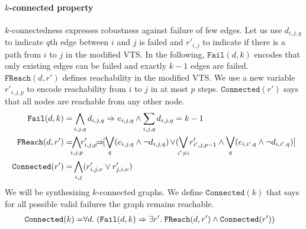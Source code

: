 \paragraph{$k$-connected property}
%
$k$-connectedness expresses robustness against failure of few edges.
%
Let us use $d_{i,j,q}$ to indicate $q$th edge between $i$ and $j$ is failed
and $r'_{i,j}$ to indicate if there is a path from $i$ to $j$ in
the modified VTS.
%
%
In the following, $\texttt{Fail}(d,k)$ encodes that only
existing edges can be failed and exactly $k-1$ edges are failed.
%
$\texttt{FReach}(d,r')$ defines reachability in the modified VTS.
%
We use a new variable $r'_{i,j,p}$ to encode reachability from
$i$ to $j$ in at most $p$ steps.
%
$\texttt{Connected}(r')$ says that all nodes are reachable from any
other node.
\begin{align*}
  \texttt{Fail}(d,k) = & 
  \bigwedge\limits_{i,j,q} d_{i,j,q} \limplies e_{i,j,q}  \land 
  \sum_{i,j,q} d_{i,j,q} = k-1\\
  \texttt{FReach}(d,r') = &\hspace{-1ex}
   \bigwedge\limits_{i,j,p}  \hspace{-1ex}r^{\prime}_{i,j,p} \hspace{-1ex}\limplies\hspace{-1ex} [\bigvee_{q} (e_{i,j,q} \land  \neg d_{i,j,q}) \hspace{-1pt}\lor \hspace{-2pt} (\bigvee_{\mathclap{i' \neq i}}  r^{\prime}_{i',j,p-1} \land  \bigvee_{q} (e_{i,i',q} \land \neg d_{i,i',q}) ]\\
  \texttt{Connected}(r') = & \Land\limits_{i,j} (r^{\prime}_{i,j,\nu} \lor r^{\prime}_{j,i,\nu})
\end{align*}
We will be synthesizing $k$-connected graphs.
%
We define $\texttt{Connected}(k)$ that says for all possible valid failures
the graph remains reachable. 
\begin{align*}
  \texttt{Connected}(k) = & \forall d.\;
          (\texttt{Fail}(d,k) \Rightarrow \exists r'.\;\texttt{FReach}(d,r')
                                \land \texttt{Connected}(r'))
\end{align*}
